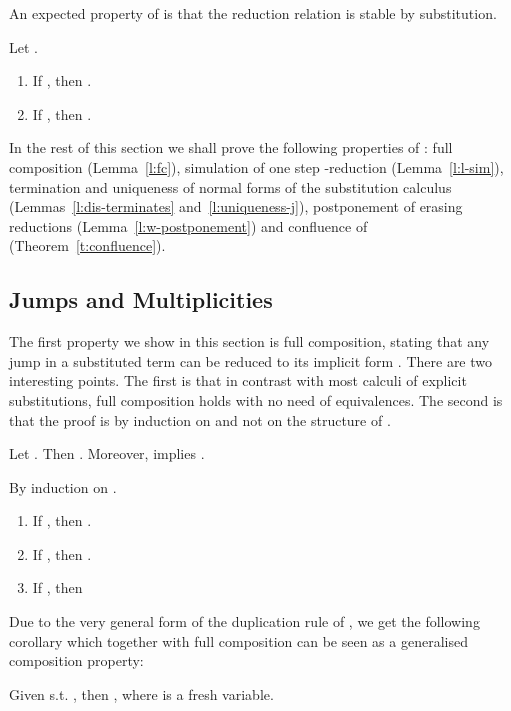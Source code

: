 \documentclass{LMCS}
\renewcommand{\>}{\rightarrow}
\begin{document}
An expected property of  is that the reduction relation  is  stable by substitution. 
\begin{lem} Let .
\begin{enumerate}[]
\item If , then . 
\item If , then . 
\end{enumerate}
\end{lem}


In the rest of this section we shall prove the following properties of :
full composition (Lemma~\ref{l:fc}), 
simulation of one step -reduction (Lemma~\ref{l:l-sim}),
termination and uniqueness of normal forms of the  substitution calculus 
(Lemmas~\ref{l:dis-terminates} and~\ref{l:uniqueness-j}),
postponement of erasing reductions (Lemma~\ref{l:w-postponement})
and confluence of  (Theorem~\ref{t:confluence}).



\subsection{Jumps and Multiplicities}
\label{ss:struct-subs-and-mul}
The first property we show in this section 
is full composition, stating  that any 
jump  in a substituted term   can be
reduced to its implicit form .  There are two
  interesting points. The first is that in contrast with most calculi
  of explicit substitutions, full composition holds with no need of
  equivalences. The second is that the proof is by
  induction on  and not on the structure of .

\begin{lem}
\label{l:fc}
Let  .  Then  . Moreover,  implies
.
\end{lem}


\proof
By induction on .
\begin{enumerate}[]
\item If , then .
\item If , then 
      .
\item If , then 
\bigskip
\end{enumerate}


Due to the very general form of the duplication rule
of , we get the following corollary which together with full composition can be seen as a generalised composition property: 

\begin{cor}
Given   s.t.  , then , where  is a
fresh variable. 
\end{cor}
\end{document}
